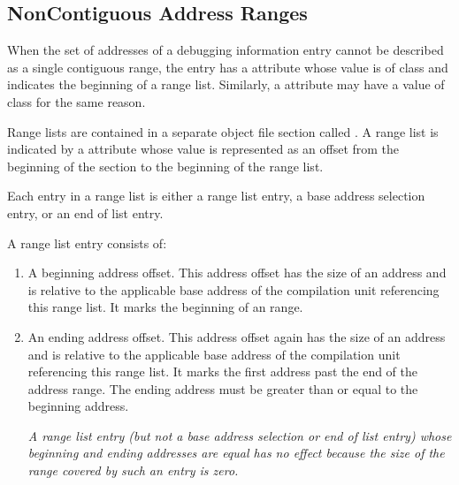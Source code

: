 \subsection{Non\dash Contiguous Address Ranges}
\label{chap:noncontiguousaddressranges}
When the set of addresses of a debugging information entry
cannot be described as a single contiguous range, the entry has
a  attribute 
whose value is of class 
and indicates the beginning of a range list. Similarly,
a  attribute may have a value of class
 for the same reason.  

Range lists are contained
in a separate object file section called 
. A
range list is indicated by a 
 attribute whose
value is represented as an offset from the beginning of the
 section to the beginning of the range list.

Each entry in a range list is either a range list entry,
a base address selection entry, or an 
end of list entry.

A range list entry consists of:

\begin{enumerate}[1]
\item A beginning address offset. This address offset has the size of an address and is relative to
the applicable base address of the compilation unit referencing this range list. It marks the
beginning of an 
range.

\item An ending address offset. This address offset again has the size of an address and is relative
to the applicable base address of the compilation unit referencing this range list. It marks the
first address past the end of the address range.
The ending address must be greater than or
equal to the beginning address.

\textit{A range list entry (but not a base address selection or end of list entry) whose beginning and
ending addresses are equal has no effect because the size of the range covered by such an
entry is zero.}
\end{enumerate}

